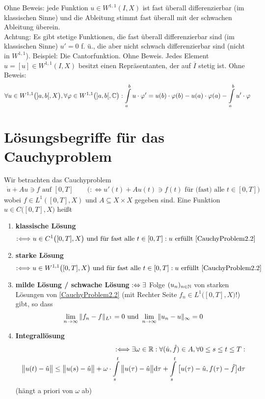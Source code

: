 Ohne Beweis: jede Funktion $u\in W^{1,1}(I,X)$ ist fast überall differenzierbar (im klassischen Sinne) und die Ableitung stimmt fast überall mit der schwachen Ableitung überein.\\
Achtung: Es gibt stetige Funktionen, die fast überall differenzierbar sind (im klassischen Sinne) $u'=0$ f. ü., die aber nicht schwach differenzierbar sind (nicht in $W^{1,1}$). 
Beispiel: Die Cantorfunktion.\nl
Ohne Beweis. Jedes Element $u=[u]\in W^{1,1}(I,X)$ besitzt einen Repräsentanten, der auf $\overline{I}$ stetig ist.\nl
Ohne Beweis:
\begin{align*}
	\forall u\in W^{1,1}\big(]a,b[,X\big),\forall\varphi\in W^{1,1}\big(]a,b[,\mathbb{C}\big):
	\int\limits_a^b u\cdot\varphi'=u(b)\cdot\varphi(b)-u(a)\cdot\varphi(a)-\int\limits_a^b u'\cdot\varphi
\end{align*}

\section*{Lösungsbegriffe für das Cauchyproblem} %
Wir betrachten das Cauchyproblem
\begin{align}\label{CauchyProblem2.2}\tag{CP}
	\dot{u}+Au\ni f\text{ auf }[0,T] 
	\qquad\Big(:\Longleftrightarrow u'(t)+A u(t)\ni f(t)\text{ für (fast) alle }t\in[0,T]\Big)
\end{align}
wobei $f\in L^1([0,T],X)$ und $A\subseteq X\times X$ gegeben sind. 
Eine Funktion $u\in C\big([0,T],X)$ heißt
\begin{enumerate}[label=(\alph*)]
	\item \textbf{klassische Lösung}
	\begin{align*}
		:\Longleftrightarrow u\in C^1\big([0,T],X\big)\text{ und für fast alle }t\in[0,T]:u\text{ erfüllt }\eqref{CauchyProblem2.2}
	\end{align*}
	\item \textbf{starke Lösung}
	\begin{align*}
		:\Longleftrightarrow u\in W^{1,1}\big([0,T],X\big)\text{ und für fast alle }t\in[0,T]:u\text{ erfüllt }\eqref{CauchyProblem2.2}
	\end{align*}
	\item \textbf{milde Lösung / schwache Lösung} $:\Leftrightarrow\exists$ Folge $(u_n)_{n\in\mathbb{N}}$ von starken Lösungen von \eqref{CauchyProblem2.2} 
	(mit Rechter Seite $f_n\in L^1\big([0,T],X\big)$!) gibt, so dass
	\begin{align*}
		\lim\limits_{n\to\infty}\Vert f_n-f\Vert_{L^1}=0\text{ und }\lim\limits_{n\to\infty}\Vert u_n-u\Vert_\infty=0
	\end{align*}
	\item \textbf{Integrallösung}
	\begin{align*}
		:\Longleftrightarrow\exists\omega\in\mathbb{R}:\forall(\hat{u},\hat{f})\in A,\forall 0\leq s\leq t\leq T:\\
		\big\Vert u(t)-\hat{u}\big\Vert\leq\big\Vert u(s)-\hat{u}\big\Vert+\omega\cdot\int\limits_s^t\big\Vert u(\tau)-\hat{u}\big\Vert\mathrm{d}\tau+\int\limits_s^t\big[u(\tau)-\hat{u},f(\tau)-\hat{f}\big]\mathrm{d}\tau
	\end{align*}
	(hängt a priori von $\omega$ ab)
\end{enumerate}

